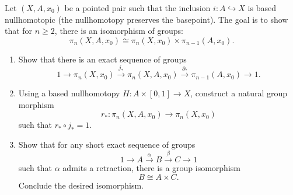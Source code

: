     \begin{problem}[]
        Let $\left( X,A,x_0 \right) $ be a pointed pair
        such that the inclusion
        $i \colon A \hookrightarrow X$ is based nullhomotopic
        (the nullhomotopy preserves the basepoint). The goal
        is to show that for $n\ge 2$, there is an isomorphism
        of groups:
        \[
        \pi_n (X,A,x_0) \cong \pi_n (X,x_0) \times 
        \pi_{n-1}(A,x_0).
        \] 
        \begin{enumerate}
            \item Show that there is an exact sequence
                of groups
                \[
                1 \to \pi_n (X,x_0) 
                \stackrel{j_*}{\to} 
                \pi_n \left( X, A, x_0 \right) 
                \stackrel{\partial_*}{\to} 
                \pi_{n-1}(A,x_0) \to 1.
                \] 
            \item Using a based nullhomotopy
                $H \colon A \times \left[ 0,1 \right] 
                \to X$, construct a natural group morphism
                \[
                r_* \colon \pi_n (X,A,x_0) \to 
                \pi_n (X,x_0)
                \] 
                such that $r_* \circ j_* = 1$.
            \item Show that for any short exact sequence
                of groups
                \[
                1 \to A \stackrel{\alpha}{\to} 
                B \stackrel{\beta}{\to} C \to 1
                \] 
                such that $\alpha$ admits a retraction, there
                is a group isomorphism
                \[
                B \cong A \times C.
                \] 
                Conclude the desired isomorphism.
        \end{enumerate}
    \end{problem}

